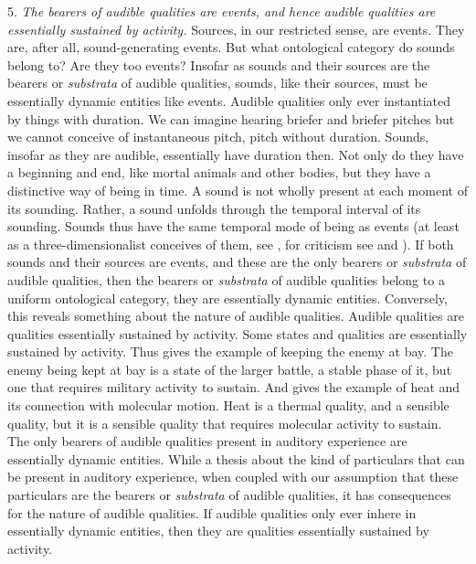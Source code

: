 \documentclass[12pt]{article}
\begin{document}
5. \emph{The bearers of audible qualities are events, and hence audible qualities are essentially sustained by activity.} Sources, in our restricted sense, are events. They are, after all, sound-generating events. But what ontological category do sounds belong to? Are they too events? Insofar as sounds and their sources are the bearers or \emph{substrata} of audible qualities, sounds, like their sources, must be essentially dynamic entities like events. Audible qualities only ever instantiated by things with duration. We can imagine hearing briefer and briefer pitches but we cannot conceive of instantaneous pitch, pitch without duration. Sounds, insofar as they are audible, essentially have duration then. Not only do they have a beginning and end, like mortal animals and other bodies, but they have a distinctive way of being in time. A sound is not wholly present at each moment of its sounding. Rather, a sound unfolds through the temporal interval of its sounding. Sounds thus have the same temporal mode of being as events (at least as a three-dimensionalist conceives of them, see \citealt{Fine:2006fk}, for criticism see \citealt{Sider:1997fk} and \citealt{Hawthorne:2008uq}). If both sounds and their sources are events, and these are the only bearers or \emph{substrata} of audible qualities, then the bearers or \emph{substrata} of audible qualities belong to a uniform ontological category, they are essentially dynamic entities. Conversely, this reveals something about the nature of audible qualities. Audible qualities are qualities essentially sustained by activity. Some states and qualities are essentially sustained by activity. Thus \citet{Ryle:1949qr} gives the example of keeping the enemy at bay. The enemy being kept at bay is a state of the larger battle, a stable phase of it, but one that requires military activity to sustain. And \citet{kripke72} gives the example of heat and its connection with molecular motion. Heat is a thermal quality, and a sensible quality, but it is a sensible quality that requires molecular activity to sustain. The only bearers of audible qualities present in auditory experience are essentially dynamic entities. While a thesis about the kind of particulars that can be present in auditory experience, when coupled with our assumption that these particulars are the bearers or \emph{substrata} of audible qualities, it has consequences for the nature of audible qualities. If audible qualities only ever inhere in essentially dynamic entities, then they are qualities essentially sustained by activity. 
\end{document}
